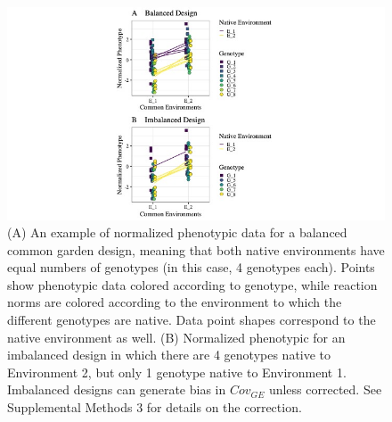 \documentclass[11pt, oneside]{amsart}
\begin{document}
\clearpage
\newpage

\renewcommand\thefigure{S7}
\begin{figure}[h]
\begin{center}
\includegraphics[width=6in]{Figs/Balanced_Imbalanced.jpg}
\end{center}
\label{Fig: }
\caption[Examples of sample data and reaction norms for balanced (A) vs. unbalanced designs (B) that correspond to Supplementary Table 1 above. ] {(A) An example of normalized phenotypic data for a balanced common garden design, meaning that both native environments have equal numbers of genotypes (in this case, 4 genotypes each). Points show phenotypic data colored according to genotype, while reaction norms are colored according to the environment to which the different genotypes are native. Data point shapes correspond to the native environment as well.  (B) Normalized phenotypic for an imbalanced design in which there are 4 genotypes native to Environment 2, but only 1 genotype native to Environment 1. Imbalanced designs can generate bias in $Cov_{GE}$ unless corrected. See Supplemental Methods 3 for details on the correction. }

\end{figure}

\clearpage
\newpage
\end{document}
